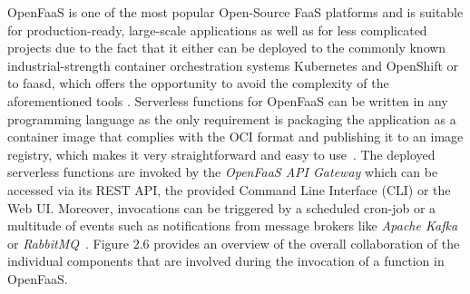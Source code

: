 OpenFaaS is one of the most popular Open-Source FaaS platforms and is suitable for production-ready, large-scale applications as well as for less complicated projects due to the fact that it either can be deployed to the commonly known industrial-strength container orchestration systems Kubernetes and OpenShift or to faasd, which offers the opportunity to avoid the complexity of the aforementioned tools \parencite{openfaas-deployment}. Serverless functions for OpenFaaS can be written in any programming language as the only requirement is packaging the application as a container image that complies with the OCI format and publishing it to an image registry, which makes it very straightforward and easy to use~\parencite{openfaas-intro}. The deployed serverless functions are invoked by the \textit{OpenFaaS API Gateway} which can be accessed via its REST API, the provided Command Line Interface (CLI) or the Web UI. Moreover, invocations can be triggered by a scheduled cron-job or a multitude of events such as notifications from message brokers like \textit{Apache Kafka} or \textit{RabbitMQ}~\parencite{openfaas-triggers}. Figure 2.6 provides an overview of the overall collaboration of the individual components that are involved during the invocation of a function in OpenFaaS.


